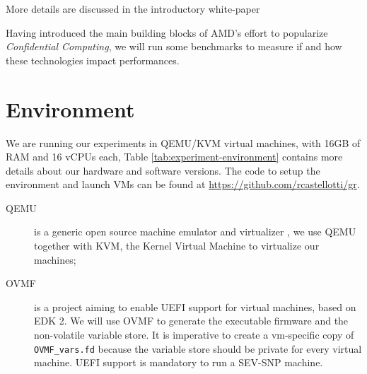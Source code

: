 \documentclass[twocolumn]{article}
\begin{document}
More details are discussed in the introductory white-paper \cite{sev-snp}

Having introduced the main building blocks of AMD's effort to popularize \textit{Confidential Computing}, we will run some benchmarks to measure if and how these technologies impact performances.

\section{Environment}
\label{sec:environment}
    
We are running our experiments in QEMU/KVM virtual machines, with 16GB of RAM and 16 vCPUs each, Table \ref{tab:experiment-environment} contains more details about our hardware and software versions. The code to setup the environment and launch VMs can be found at \href{https://github.com/rcastellotti/gr}{https://github.com/rcastellotti/gr}.

\begin{description}
    \item[QEMU] is a generic open source machine emulator and virtualizer \cite{qemu}, we use QEMU together with KVM, the Kernel Virtual Machine to virtualize our machines;
    \item[OVMF] is a project \cite{ovmf} aiming to enable UEFI support for virtual machines, based on EDK 2. We will use OVMF to generate the executable firmware and the non-volatile variable store. It is imperative to create a vm-specific copy of \texttt{OVMF\_vars.fd} because the variable store should be private for every virtual machine. UEFI support is mandatory to run a SEV-SNP machine.
\end{description}
\end{document}
